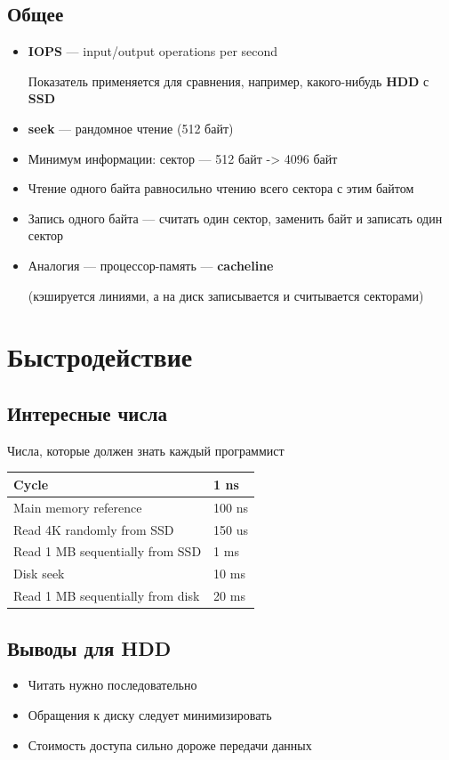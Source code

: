 \documentclass[../../lectures.tex]{subfiles}
\begin{document}
\subsection{Общее}
\begin{itemize}
    \item \textbf{IOPS} --- input/output operations per second
        
          Показатель применяется для сравнения, например, какого-нибудь \textbf{HDD} с \textbf{SSD}
    \item \textbf{seek} --- рандомное чтение (512 байт)
    \item Минимум информации: сектор --- 512 байт -> 4096 байт
    \item Чтение одного байта равносильно чтению всего сектора с этим байтом
    \item Запись одного байта --- считать один сектор, заменить байт и записать один сектор
    \item Аналогия --- процессор-память --- \textbf{cacheline} 
        
         (кэшируется линиями, а на диск записывается и считывается секторами)
\end{itemize}

\section{Быстродействие}
\subsection{Интересные числа}
\begin{center}
Числа, которые должен знать каждый программист
\begin{tabular}{| l | l |}
    \hline
    Cycle                            & 1   ns \\ \hline
    Main memory reference            & 100 ns \\ \hline
    Read 4K randomly from SSD        & 150 us \\ \hline
    Read 1 MB sequentially from SSD  & 1   ms \\ \hline
    Disk seek                        & 10  ms \\ \hline
    Read 1 MB sequentially from disk & 20  ms \\ \hline
\end{tabular}
\end{center}
\subsection{Выводы для HDD}
\begin{itemize}
    \item Читать нужно последовательно
    \item Обращения к диску следует минимизировать
    \item Стоимость доступа сильно дороже передачи данных
\end{itemize}
\end{document}
